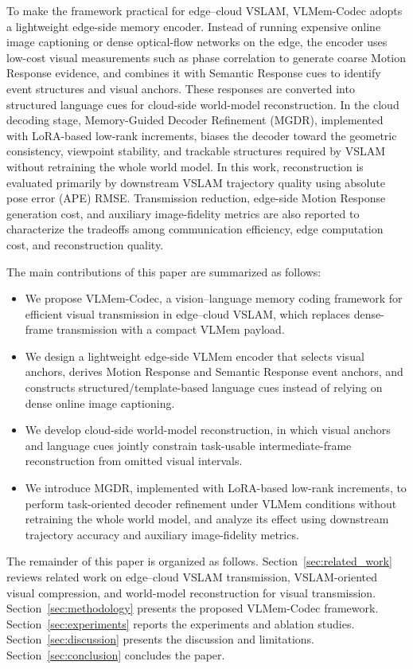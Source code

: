 \documentclass[journal]{IEEEtran}
\begin{document}
To make the framework practical for edge--cloud VSLAM, VLMem-Codec adopts a lightweight edge-side memory encoder. Instead of running expensive online image captioning or dense optical-flow networks on the edge, the encoder uses low-cost visual measurements such as phase correlation to generate coarse Motion Response evidence, and combines it with Semantic Response cues to identify event structures and visual anchors. These responses are converted into structured language cues for cloud-side world-model reconstruction. In the cloud decoding stage, Memory-Guided Decoder Refinement (MGDR), implemented with LoRA-based low-rank increments, biases the decoder toward the geometric consistency, viewpoint stability, and trackable structures required by VSLAM without retraining the whole world model. In this work, reconstruction is evaluated primarily by downstream VSLAM trajectory quality using absolute pose error (APE) RMSE. Transmission reduction, edge-side Motion Response generation cost, and auxiliary image-fidelity metrics are also reported to characterize the tradeoffs among communication efficiency, edge computation cost, and reconstruction quality.

The main contributions of this paper are summarized as follows:
\begin{itemize}
    \item We propose VLMem-Codec, a vision--language memory coding framework for efficient visual transmission in edge--cloud VSLAM, which replaces dense-frame transmission with a compact VLMem payload.
    \item We design a lightweight edge-side VLMem encoder that selects visual anchors, derives Motion Response and Semantic Response event anchors, and constructs structured/template-based language cues instead of relying on dense online image captioning.
    \item We develop cloud-side world-model reconstruction, in which visual anchors and language cues jointly constrain task-usable intermediate-frame reconstruction from omitted visual intervals.
    \item We introduce MGDR, implemented with LoRA-based low-rank increments, to perform task-oriented decoder refinement under VLMem conditions without retraining the whole world model, and analyze its effect using downstream trajectory accuracy and auxiliary image-fidelity metrics.
\end{itemize}

The remainder of this paper is organized as follows. Section~\ref{sec:related_work} reviews related work on edge--cloud VSLAM transmission, VSLAM-oriented visual compression, and world-model reconstruction for visual transmission. Section~\ref{sec:methodology} presents the proposed VLMem-Codec framework. Section~\ref{sec:experiments} reports the experiments and ablation studies. Section~\ref{sec:discussion} presents the discussion and limitations. Section~\ref{sec:conclusion} concludes the paper.
\end{document}
